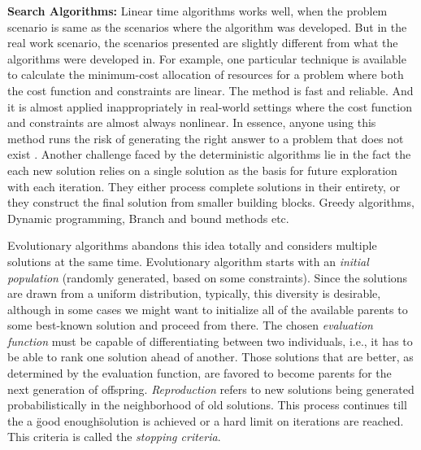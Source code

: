 \documentclass{sig-alternative}
\begin{document}
    \textbf{Search Algorithms: }Linear time algorithms works well, when the problem scenario is same as the scenarios where the algorithm was developed. But in the real work scenario, the scenarios presented are slightly different from what the algorithms were developed in. For example, one particular technique is available to calculate the minimum-cost allocation of resources for a problem where both the cost function and constraints are linear. The method is fast and reliable. And it is almost applied inappropriately  in real-world settings where the cost function and constraints are almost always nonlinear. In essence, anyone using this method runs the risk of generating the right answer to a problem that does not exist \cite{michalewicz2013solve}. 
    Another challenge faced by the deterministic algorithms lie in the fact the each new solution
relies on a single solution as the basis for future exploration with each iteration. They either process complete solutions in their entirety, or they construct the final solution from smaller building blocks. Greedy algorithms,
Dynamic programming, Branch and bound methods etc. 

Evolutionary algorithms abandons this idea totally and considers multiple solutions at the same time. Evolutionary algorithm starts with an \textit{initial population} (randomly generated, based on some constraints). Since the solutions are drawn from a uniform distribution, typically, this diversity is desirable, although in some cases we might want to initialize all of the available parents to some best-known solution and proceed from there. The chosen \textit{evaluation function} must be capable of differentiating
between two individuals, i.e., it has to be able to rank one solution ahead
of another. Those solutions that are better, as determined by the evaluation
function, are favored to become parents for the next generation of offspring. 
\textit{Reproduction} refers to  new solutions being generated probabilistically in the neighborhood of old solutions. This process continues till the a \"good enough\" solution is achieved or a hard limit on iterations are reached. This criteria is called the \textit{stopping criteria}.
    
\end{document}
